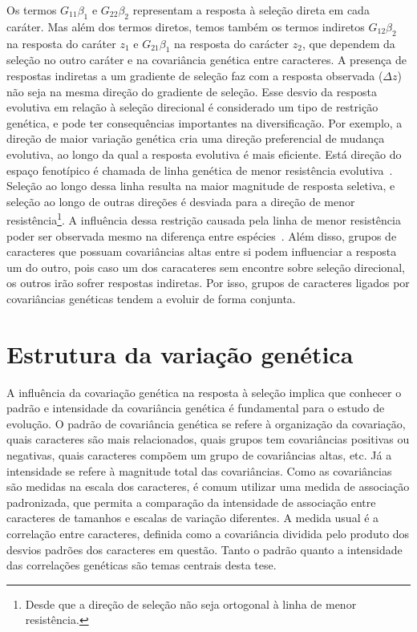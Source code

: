 \begin{refsection}
Os termos $G_{11}\beta_{1}$ e $G_{22}\beta_{2}$ representam a resposta à
seleção direta em cada caráter. Mas além dos termos diretos, temos também  os
termos indiretos $G_{12}\beta_{2}$ na resposta do caráter $z_1$ e
$G_{21}\beta_{1}$ na resposta do carácter $z_2$, que dependem da seleção no
outro caráter e na covariância genética entre caracteres. A presença de
respostas indiretas a um gradiente de seleção faz com a resposta observada
($\Delta z$) não seja na mesma direção do gradiente de seleção. Esse desvio da
resposta evolutiva em relação à seleção direcional é considerado um tipo de
restrição genética, e pode ter consequências importantes na diversificação.
Por exemplo, a direção de maior variação genética cria uma direção
preferencial de mudança evolutiva, ao longo da qual a resposta evolutiva é
mais eficiente. Está direção do espaço fenotípico é chamada de linha genética
de menor resistência evolutiva~\parencite{Schluter1996-gw}. Seleção ao longo
dessa linha resulta na maior magnitude de resposta seletiva, e seleção ao
longo de outras direções é desviada para a direção de menor
resistência\footnote{Desde que a direção de seleção não seja ortogonal à linha
de menor resistência.}. A influência dessa restrição causada pela linha de
menor resistência poder ser observada mesmo na diferença entre
espécies~\parencite{Marroig2005-ce}. Além disso, grupos de caracteres que
possuam covariâncias altas entre si podem influenciar a resposta um do outro,
pois caso um dos caracateres sem encontre sobre seleção direcional, os outros
irão sofrer respostas indiretas. Por isso, grupos de caracteres ligados por
covariâncias genéticas tendem a evoluir de forma conjunta.

\section{Estrutura da variação genética}

A influência da covariação genética na resposta à seleção implica que conhecer
o padrão e intensidade da covariância genética é fundamental para o estudo de
evolução. O padrão de covariância genética se refere à organização da
covariação, quais caracteres são mais relacionados, quais grupos tem
covariâncias positivas ou negativas, quais caracteres compõem um grupo de
covariâncias altas, etc. Já a intensidade se refere à magnitude total das
covariâncias. Como as covariâncias são medidas na escala dos caracteres, é
comum utilizar uma medida de associação padronizada, que permita a comparação
da intensidade de associação entre caracteres de tamanhos e escalas de
variação diferentes. A medida usual é a correlação entre caracteres, definida
como a covariância dividida pelo produto dos desvios padrões dos caracteres em
questão. Tanto o padrão quanto a intensidade das correlações genéticas são temas
centrais desta tese.


\end{refsection}
